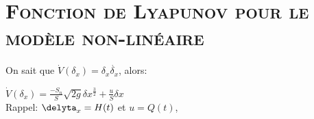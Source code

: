 \section{\textsc{Fonction de Lyapunov pour le modèle non-linéaire}}
		
		\par On sait que  $\dot{V}(\delta_x) = \delta_x \dot{\delta_x} $, alors:\\[0.25 cm]
		\begin{center}
		$\dot{V}(\delta_x) = \frac{-S_n}{S} \sqrt{2g} \delta{x}^{\frac{3}{2}} + \frac{u}{S} \delta{x} $\\[0.25 cm]
		Rappel: $ \delyta_x = H(t)$ et $ u = Q(t) $,    
		\end{center} 
		 